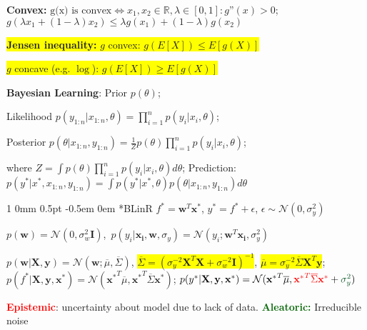 \documentclass[11pt,landscape,a4paper,fleqn]{article}
\makeatletter
\newcommand*{\rsection}{%
	\@startsection{section}%
	{1}%
	{0mm}%
	{0.5pt}%
	{-0.5em \@plus 0em}
	{\color{myorange}\sffamily\small\bfseries}}
\newcommand{\mhl}[1]{\setlength{\fboxsep}{0pt}\colorbox{yellow}{#1}}
\makeatother
\begin{document}
\begin{multicols*}{4}

\textbf{Convex:}
$\text{g(x) is convex} \Leftrightarrow x_1,x_2 \in \mathbb{R}, \lambda \in [0,1]: g\text{''}(x) > 0$;
$g(\lambda x_1 + (1-\lambda) x_2) \leq \lambda g(x_1) + (1-\lambda) g(x_2)$

\mhl{\textbf{Jensen inequality: }$g$ convex: $g(E[X]) \leq E[g(X)]$}

\mhl{$g$ concave (e.g. $\log$): $g(E[X]) \geq E[g(X)]$}

\textbf{Bayesian Learning}:
Prior $p(\theta)$;

Likelihood $p(y_{1:n} | x_{1:n}, \theta) = \prod_{i=1}^{n} p(y_i | x_i, \theta)$;

Posterior $p(\theta | x_{1:n}, y_{1:n}) = \frac{1}{Z} p(\theta) \prod_{i=1}^{n} p(y_i | x_i, \theta)$;

where $Z = \int p(\theta) \prod_{i=1}^{n} p(y_i | x_i, \theta) d\theta$;
Prediction: $p(y^* | x^*, x_{1:n}, y_{1:n}) = \int p(y^* | x^*, \theta) p(\theta | x_{1:n}, y_{1:n}) d\theta$

\rsection*{BLinR} $f^* = \mathbf{w}^T\mathbf{x}^*$, $y^* = f^* + \epsilon$, $\epsilon \sim \mathcal{N}(0, \sigma_y^2)$

\vspace*{-0.5mm}
\mbox{\fontsize{9.8}{6}\selectfont $p(\mathbf{w}) = \mathcal{N}(0, \sigma_w^2 \mathbf{I})$, $p(y_i|\mathbf{x_i}, \mathbf{w}, \sigma_y) = \mathcal{N}(y_i; \mathbf{w}^T\mathbf{x_i}, \sigma_y^2)$}

\vspace*{-0.5mm}
$p(\mathbf{w} | \mathbf{X, y}) = \mathcal{N}(\mathbf{w}; \overline{\mu}, \overline{\Sigma})$,
\mhl{$\overline{\Sigma} = (\sigma_y^{-2}\mathbf{X}^T\mathbf{X} + \sigma_w^{-2} \mathbf{I})^{-1}$},
\mhl{$\overline{\mu} = \sigma_y^{-2} \overline{\Sigma} \mathbf{X}^T\mathbf{y}$};
$p(f^* | \mathbf{X,y,x^*}) = \mathcal{N}(\mathbf{x^*}^T\overline{\mu}, {\mathbf{x}^*}^T \overline{\Sigma} \mathbf{x}^*)$;
$p(y^* | \mathbf{X,y,x^*}) = \mathcal{N}({\mathbf{x}^*}^T \overline{\mu}, \textcolor{red}{{\mathbf{x}^*}^T \overline{\Sigma} \mathbf{x}^*} + \textcolor{darkgreen}{\sigma_y^2})$

\textcolor{red}{\textbf{Epistemic}}: uncertainty about model due to lack of data. \textcolor{darkgreen}{\textbf{Aleatoric:}} Irreducible noise


\end{multicols*}
\end{document}
